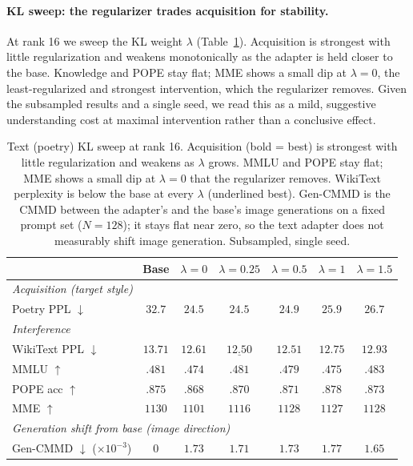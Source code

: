 \documentclass{article}
\begin{document}
\paragraph{KL sweep: the regularizer trades acquisition for stability.}
At rank 16 we sweep the KL weight $\lambda$ (Table~\ref{tab:text-kl}). Acquisition
is strongest with little regularization and weakens monotonically as the adapter
is held closer to the base. Knowledge and POPE stay flat; MME shows a small dip at
$\lambda{=}0$, the least-regularized and strongest intervention, which the
regularizer removes. Given the subsampled results and a single seed, we read this
as a mild, suggestive understanding cost at maximal intervention rather than a
conclusive effect.

\begin{table}[t]
\centering\small
\setlength{\tabcolsep}{7pt}
\begin{tabular}{lcccccc}
\toprule
 & \textbf{Base} & $\lambda{=}0$ & $\lambda{=}0.25$ & $\lambda{=}0.5$ & $\lambda{=}1$ & $\lambda{=}1.5$ \\
\midrule
\multicolumn{7}{l}{\textit{Acquisition (target style)}}\\
Poetry PPL $\downarrow$   & $32.7$ & $\mathbf{24.5}$ & $24.5$ & $24.9$ & $25.9$ & $26.7$ \\
\midrule
\multicolumn{7}{l}{\textit{Interference}}\\
WikiText PPL $\downarrow$ & $13.71$ & $12.61$ & $\underline{12.50}$ & $12.51$ & $12.75$ & $12.93$ \\
MMLU $\uparrow$           & $.481$ & $.474$ & $.481$ & $.479$ & $.475$ & $.483$ \\
POPE acc $\uparrow$       & $.875$ & $.868$ & $.870$ & $.871$ & $.878$ & $.873$ \\
MME $\uparrow$            & $1130$ & $1101$ & $1116$ & $1128$ & $1127$ & $1128$ \\
\midrule
\multicolumn{7}{l}{\textit{Generation shift from base (image direction)}}\\
Gen-CMMD $\downarrow$ ($\times10^{-3}$) & $0$ & $1.73$ & $1.71$ & $1.73$ & $1.77$ & $1.65$ \\
\bottomrule
\end{tabular}
\caption{Text (poetry) KL sweep at rank 16. Acquisition (bold = best) is
strongest with little regularization and weakens as $\lambda$ grows. MMLU and
POPE stay flat; MME shows a small dip at $\lambda{=}0$ that the regularizer
removes. WikiText perplexity is below the base at every $\lambda$ (underlined
best). Gen-CMMD is the CMMD between the adapter's and the base's image generations on a
fixed prompt set ($N{=}128$); it stays flat near zero, so the text adapter does not
measurably shift image generation. Subsampled, single seed.}
\label{tab:text-kl}
\end{table}
\end{document}
